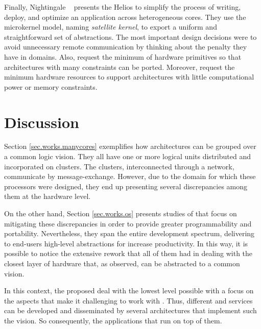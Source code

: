 	Finally, Nightingale \etal~\cite{nightingale2009} presents the Helios \os to
	simplify the process of writing, deploy, and optimize an application across
	heterogeneous cores.
	They use the microkernel model, naming \textit{satellite kernel}, to export
	a uniform and straightforward set of \os abstractions.
	The most important design decisions were to avoid unnecessary remote communication
	by thinking about the penalty they have in \numa domains.
	Also, request the minimum of hardware primitives so that architectures with many
	constraints can be ported.
	Moreover, request the minimum hardware resources to support architectures with little
	computational power or memory constraints.

\section{Discussion}

	Section \ref{sec.works.manycores} exemplifies how \manycore architectures can be
	grouped over a common logic vision.
	They all have one or more logical units distributed and incorporated on clusters.
	The clusters, interconnected through a network, communicate by message-exchange.
	However, due to the domain for which these processors were designed, they end up
	presenting several discrepancies among them at the hardware level.

	On the other hand, Section \ref{sec.works.os} presents studies of \oses that focus on
	mitigating these discrepancies in order to provide greater programmability and portability.
	Nevertheless, they span the entire development spectrum, delivering to end-users
	high-level abstractions for increase productivity.
	In this way, it is possible to notice the extensive rework that all of them had in
	dealing with the closest layer of hardware that, as observed, can be abstracted to
	a common vision.

	In this context, the proposed \hal deal with the lowest level possible with a focus
	on the aspects that make it challenging to work with \manycores.
	Thus, different \oses and services can be developed and disseminated by several
	architectures that implement such the vision.
	So consequently, the applications that run on top of them.